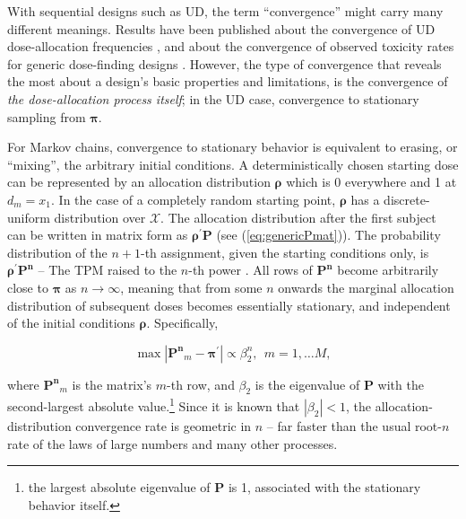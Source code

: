 With sequential designs such as UD, the term ``convergence'' might carry many different meanings. Results have been published about the convergence of UD dose-allocation frequencies \citep{Durh:Flou:up-a:1995,Durh:Flou:Mont:up-a:1995}, and about the convergence of observed toxicity rates for generic dose-finding designs \citep{oron:azri:hoff:dose:2011}. However, the type of convergence that reveals the most about a design's basic properties and limitations, is the convergence of \emph{the dose-allocation process itself}; in the UD case, convergence to stationary sampling from $\boldsymbol{\pi}$.

For Markov chains, convergence to stationary behavior is equivalent to erasing, or ``mixing'', the arbitrary initial conditions. A deterministically chosen starting dose can be represented by an allocation distribution $\boldsymbol{\rho}$ which is 0 everywhere and 1 at $d_m=x_1$. In the case of a completely random starting point, $\boldsymbol{\rho}$ has a discrete-uniform distribution over $\mathcal{X}$. The allocation distribution after the first subject can be written in matrix form as $\boldsymbol{\rho}^{'}\mathbf{P}$ (see (\ref{eq:genericPmat})). The probability distribution of the $n+1$-th assignment, given the starting conditions only, is $\boldsymbol{\rho}^{'}\mathbf{P^n}$ -- The TPM raised to the $n$-th power \citep{Diac:Stro:geom:1991}. All rows of $\mathbf{P^n}$ become arbitrarily close to $\boldsymbol{\pi}$ as $n\to\infty$, meaning that from some $n$ onwards the marginal allocation distribution of subsequent doses becomes essentially stationary, and independent of the initial conditions $\boldsymbol{\rho}$. Specifically,

\begin{equation}\label{eq:diac}
\max\left|\mathbf{P^n}_{m}-\boldsymbol{\pi}^\prime\right|\propto\beta_2^n,\ \ m=1,\ldots M,
\end{equation}

\noindent where $\mathbf{P^n}_{m}$ is the matrix's $m$-th row, and $\beta_2$ is the eigenvalue of $\mathbf{P}$ with the second-largest absolute value.\footnote{
the largest absolute eigenvalue of $\mathbf{P}$ is 1, associated with the stationary behavior itself.} Since it is known that $\left|\beta_2\right|<1$, the allocation-distribution convergence rate is geometric in $n$ --  far faster than the usual root-$n$ rate of the laws of large numbers and many other processes.

